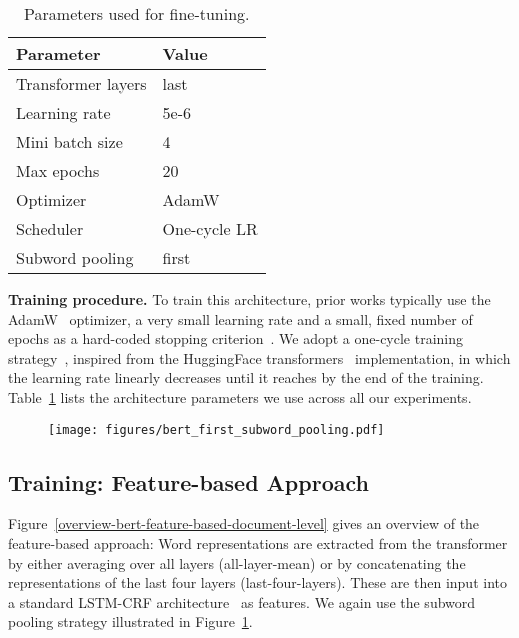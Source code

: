 \documentclass[11pt,a4paper]{article}
\begin{document}
\begin{table}[h]
\begin{center}
\begin{tabular}{ l l }
\toprule
Parameter & Value \\
\midrule
Transformer layers & last \\
Learning rate & 5e-6 \\
Mini batch size & 4 \\
Max epochs & 20 \\
Optimizer & AdamW \\ Scheduler & One-cycle LR \\
Subword pooling & first \\
\bottomrule
\end{tabular}
\end{center}
\vspace{-2mm}
\caption{\label{tab:finetuning_params} Parameters used for fine-tuning.}
\end{table}


\noindent 
\textbf{Training procedure.} 
To train this architecture, prior works typically use the AdamW~\cite{loshchilov2018decoupled} optimizer, a very small learning rate and a small, fixed number of epochs as a hard-coded stopping criterion~\cite{conneau2019unsupervised}. We adopt a one-cycle training strategy~\cite{2018arXiv180309820S}, inspired from the HuggingFace transformers~\cite{wolf2019huggingface} implementation, in which the learning rate linearly decreases until it reaches  by the end of the training. Table~\ref{tab:finetuning_params} lists the architecture parameters we use across all our experiments. 


\begin{figure}[t!]
 \centering
 \texttt{[image: figures/bert\_first\_subword\_pooling.pdf]}
 \label{fig:subword_pooling}
\end{figure}


\subsection{Training: Feature-based Approach}

Figure~\ref{overview-bert-feature-based-document-level} gives an overview of the feature-based approach: Word representations are extracted from the transformer by either averaging over all layers (all-layer-mean) or by concatenating the representations of the last four layers (last-four-layers). These are then input into a standard LSTM-CRF architecture~\cite{2015arXiv150801991H} as features. We again use the subword pooling strategy illustrated in Figure~\ref{fig:subword_pooling}. 
\end{document}
